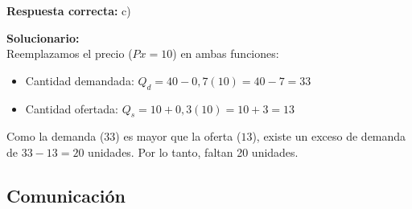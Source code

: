 \begin{enumerate}
\textbf{Respuesta correcta:} c)

\vspace{2mm}
\textbf{Solucionario:}\\
Reemplazamos el precio ($Px = 10$) en ambas funciones:
\begin{itemize}
	\item Cantidad demandada: $Q_d = 40 - 0,7(10) = 40 - 7 = 33$
	\item Cantidad ofertada: $Q_s = 10 + 0,3(10) = 10 + 3 = 13$
\end{itemize}
Como la demanda ($33$) es mayor que la oferta ($13$), existe un exceso de demanda de $33 - 13 = 20$ unidades. Por lo tanto, faltan 20 unidades.


\vspace{6mm}
	
\end{enumerate}



\subsection*{Comunicación}

